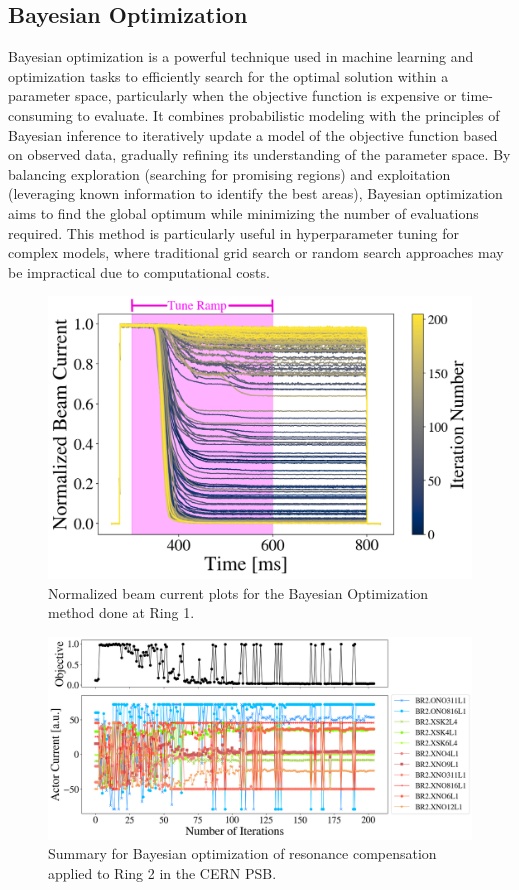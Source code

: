 \subsection{Bayesian Optimization}

Bayesian optimization is a powerful technique used in machine learning and optimization tasks to efficiently search for the optimal solution within a parameter space, particularly when the objective function is expensive or time-consuming to evaluate. It combines probabilistic modeling with the principles of Bayesian inference to iteratively update a model of the objective function based on observed data, gradually refining its understanding of the parameter space. By balancing exploration (searching for promising regions) and exploitation (leveraging known information to identify the best areas), Bayesian optimization aims to find the global optimum while minimizing the number of evaluations required. This method is particularly useful in hyperparameter tuning for complex models, where traditional grid search or random search approaches may be impractical due to computational costs.

\begin{figure}[H]
    \centering
    \includegraphics[width=\linewidth]{chapter5/i1_bo_commented.png}
    \caption{Normalized beam current plots for the Bayesian Optimization method done at Ring 1.}
    \label{fig:ibo}
\end{figure}

\begin{figure}[H]
    \centering
    \includegraphics[width=\linewidth]{chapter5/2023_05_02_R2_LHCramp_BayesOpt.png}
    \caption{Summary for Bayesian optimization of resonance compensation applied to Ring 2 in the CERN PSB.}
    \label{fig:bo1}
\end{figure}

